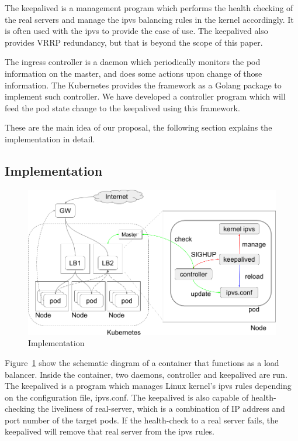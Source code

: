 The keepalived is a management program which performs the health checking of the real servers 
and manage the ipvs balancing rules in the kernel accordingly.
It is often used with the ipvs to provide the ease of use.
The keepalived also provides VRRP\cite{hinden2004virtual} redundancy, but that is beyond the scope of this paper.

The ingress controller is a daemon which periodically monitors the pod information on the master, 
and does some actions upon change of those information.
The Kubernetes provides the framework as a Golang package to implement such controller. 
We have developed a controller program which will feed the pod state change to the keepalived 
using this framework. 

These are the main idea of our proposal, the following section explains the implementation in detail.

\subsection{Implementation}\label{Implementation}

\begin{figure}
\includegraphics[width=\columnwidth]{Figs/ipvs-ingress-schem}
\caption{Implementation}
\label{fig:ipvs-ingress-schem}
\end{figure}

Figure~\ref{fig:ipvs-ingress-schem} show the schematic diagram of a container that functions as a load balancer.
Inside the container, two daemons, controller and keepalived are run.
The keepalived is a program which manages Linux kernel's ipvs rules depending on the configuration file, ipvs.conf.
The keepalived is also capable of health-checking the liveliness of real-server, 
which is a combination of IP address and port number of the target pods. 
If the health-check to a real server fails, the keepalived will remove that real server from the ipvs rules.

